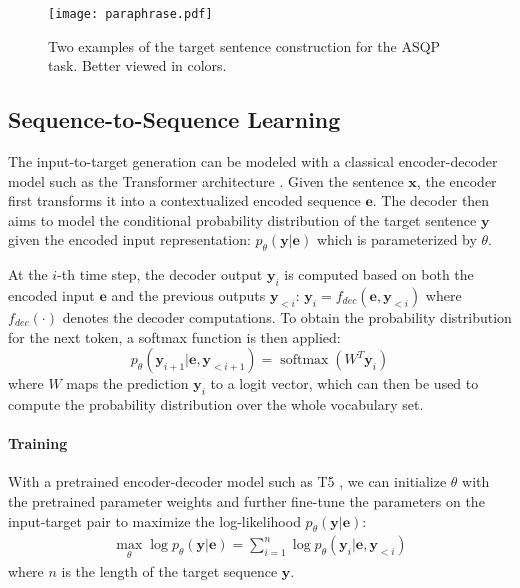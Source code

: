 \documentclass[11pt]{article}
\begin{document}
\begin{figure}
    \centering
    \texttt{[image: paraphrase.pdf]}
    \caption{Two examples of the target sentence construction for the ASQP task. Better viewed in colors.}
    \label{fig:paraphrase}
\end{figure}


\subsection{Sequence-to-Sequence Learning} \label{sec:seq2seq}
The input-to-target generation can be modeled with a classical encoder-decoder model such as the Transformer architecture \cite{nips17-transformer}. Given the sentence $\boldsymbol{x}$, the encoder first transforms it into a contextualized encoded sequence $\boldsymbol{e}$. The decoder then aims to model the conditional probability distribution of the target sentence $\boldsymbol{y}$ given the encoded input representation: $p_{\theta}(\boldsymbol{y}|\boldsymbol{e})$ which is parameterized by $\theta$. 

At the $i$-th time step, the decoder output $\boldsymbol{y}_i$ is computed based on both the encoded input $\boldsymbol{e}$ and the previous outputs $\boldsymbol{y}_{<i}$: $\boldsymbol{y}_i = f_{dec}(\boldsymbol{e}, \boldsymbol{y}_{<i})$
where $f_{dec}(\cdot)$ denotes the decoder computations. To obtain the probability distribution for the next token, a softmax function is then applied:
\begin{equation}
    p_{\theta}(\boldsymbol{y}_{i+1}|\boldsymbol{e}, \boldsymbol{y}_{<i+1})=\operatorname{softmax}(W^T \boldsymbol{y}_{i})  
\end{equation}
where $W$ maps the prediction $\boldsymbol{y}_i$ to a logit vector, which can then be used to compute the probability distribution over the whole vocabulary set.

\paragraph{Training}
With a pretrained encoder-decoder model such as T5 \cite{t5-paper}, we can initialize $\theta$ with the pretrained parameter weights and further fine-tune the parameters on the input-target pair to maximize the log-likelihood $p_{\theta}(\boldsymbol{y}|\boldsymbol{e})$:
\begin{gather}
    \max _{\theta} \log p_{\theta}(\boldsymbol{y}|\boldsymbol{e}) =\sum\nolimits_{i=1}^{n} \log p_{\theta}(\boldsymbol{y}_{i}|\boldsymbol{e}, \boldsymbol{y}_{<i})
\end{gather}
where $n$ is the length of the target sequence $\boldsymbol{y}$.
\end{document}

